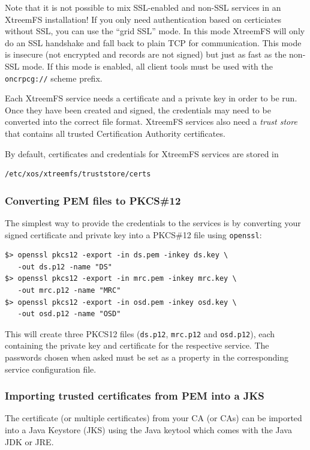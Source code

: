 \documentclass[a4paper,10pt]{book}
\begin{document}
Note that it is not possible to mix SSL-enabled and non-SSL services in an XtreemFS installation! If you only need authentication based on certiciates without SSL, you can use the ``grid SSL'' mode. In this mode XtreemFS will only do an SSL handshake and fall back to plain TCP for communication. This mode is insecure (not encrypted and records are not signed) but just as fast as the non-SSL mode. If this mode is enabled, all client tools must be used with the \texttt{oncrpcg://} scheme prefix.

Each XtreemFS service needs a certificate and a private key in order to be run. Once they have been created and signed, the credentials may need to be converted into the correct file format. XtreemFS services also need a \textit{trust store} that contains all trusted Certification Authority certificates.

By default, certificates and credentials for XtreemFS services are stored in
\begin{verbatim}
/etc/xos/xtreemfs/truststore/certs
\end{verbatim}


\subsubsection{Converting PEM files to PKCS\#12}
The simplest way to provide the credentials to the services is by converting your signed certificate and private key into a PKCS\#12 file using \texttt{openssl}:


\begin{verbatim}
$> openssl pkcs12 -export -in ds.pem -inkey ds.key \
   -out ds.p12 -name "DS"
$> openssl pkcs12 -export -in mrc.pem -inkey mrc.key \
   -out mrc.p12 -name "MRC"
$> openssl pkcs12 -export -in osd.pem -inkey osd.key \
   -out osd.p12 -name "OSD"
\end{verbatim}


This will create three PKCS12 files (\texttt{ds.p12}, \texttt{mrc.p12} and \texttt{osd.p12}), each containing the private key and certificate for the respective service. The passwords chosen when asked must be set as a property in the corresponding service configuration file.


\subsubsection{Importing trusted certificates from PEM into a JKS}

The certificate (or multiple certificates) from your CA (or CAs) can be imported into a Java Keystore (JKS)  using the Java keytool which comes with the Java JDK or JRE.
\end{document}
